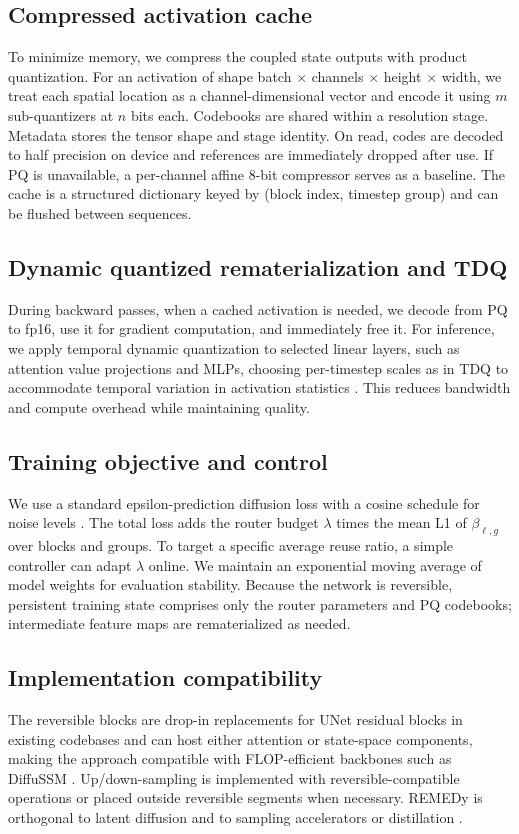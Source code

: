 \documentclass{article}
\begin{document}
\subsection{Compressed activation cache}
To minimize memory, we compress the coupled state outputs with product quantization. For an activation of shape batch $\times$ channels $\times$ height $\times$ width, we treat each spatial location as a channel-dimensional vector and encode it using $m$ sub-quantizers at $n$ bits each. Codebooks are shared within a resolution stage. Metadata stores the tensor shape and stage identity. On read, codes are decoded to half precision on device and references are immediately dropped after use. If PQ is unavailable, a per-channel affine 8-bit compressor serves as a baseline. The cache is a structured dictionary keyed by (block index, timestep group) and can be flushed between sequences.

\subsection{Dynamic quantized rematerialization and TDQ}
During backward passes, when a cached activation is needed, we decode from PQ to fp16, use it for gradient computation, and immediately free it. For inference, we apply temporal dynamic quantization to selected linear layers, such as attention value projections and MLPs, choosing per-timestep scales as in TDQ to accommodate temporal variation in activation statistics \cite{so_2023_temporal}. This reduces bandwidth and compute overhead while maintaining quality.

\subsection{Training objective and control}
We use a standard epsilon-prediction diffusion loss with a cosine schedule for noise levels \cite{ho_2020_denoising}. The total loss adds the router budget $\lambda$ times the mean L1 of $\beta_{\ell,g}$ over blocks and groups. To target a specific average reuse ratio, a simple controller can adapt $\lambda$ online. We maintain an exponential moving average of model weights for evaluation stability. Because the network is reversible, persistent training state comprises only the router parameters and PQ codebooks; intermediate feature maps are rematerialized as needed.

\subsection{Implementation compatibility}
The reversible blocks are drop-in replacements for UNet residual blocks in existing codebases and can host either attention or state-space components, making the approach compatible with FLOP-efficient backbones such as DiffuSSM \cite{yan_2023_diffusion}. Up/down-sampling is implemented with reversible-compatible operations or placed outside reversible segments when necessary. REMEDy is orthogonal to latent diffusion \cite{rombach_2021_high} and to sampling accelerators or distillation \cite{salimans_2024_multistep}.
\end{document}
